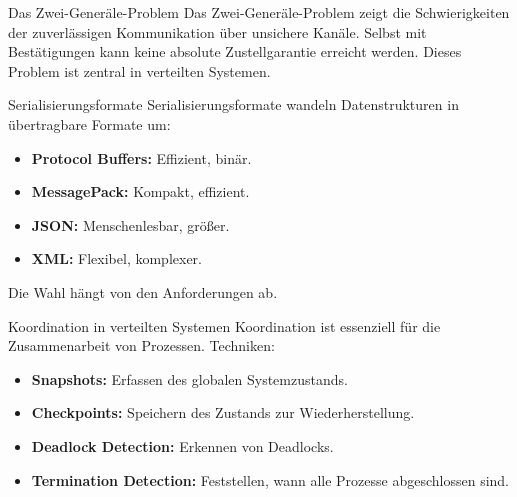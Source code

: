 \documentclass{beamer}
\begin{document}
\begin{frame}{Das Zwei-Generäle-Problem}
    Das Zwei-Generäle-Problem zeigt die Schwierigkeiten der zuverlässigen Kommunikation über unsichere Kanäle. Selbst mit Bestätigungen kann keine absolute Zustellgarantie erreicht werden. Dieses Problem ist zentral in verteilten Systemen.
\end{frame}

\begin{frame}{Serialisierungsformate}
    Serialisierungsformate wandeln Datenstrukturen in übertragbare Formate um:
    \begin{itemize}
        \item \textbf{Protocol Buffers:} Effizient, binär.
        \item \textbf{MessagePack:} Kompakt, effizient.
        \item \textbf{JSON:} Menschenlesbar, größer.
        \item \textbf{XML:} Flexibel, komplexer.
    \end{itemize}
    Die Wahl hängt von den Anforderungen ab.
\end{frame}

\begin{frame}{Koordination in verteilten Systemen}
    Koordination ist essenziell für die Zusammenarbeit von Prozessen. Techniken:
    \begin{itemize}
        \item \textbf{Snapshots:} Erfassen des globalen Systemzustands.
        \item \textbf{Checkpoints:} Speichern des Zustands zur Wiederherstellung.
        \item \textbf{Deadlock Detection:} Erkennen von Deadlocks.
        \item \textbf{Termination Detection:} Feststellen, wann alle Prozesse abgeschlossen sind.
    \end{itemize}
\end{frame}
\end{document}
